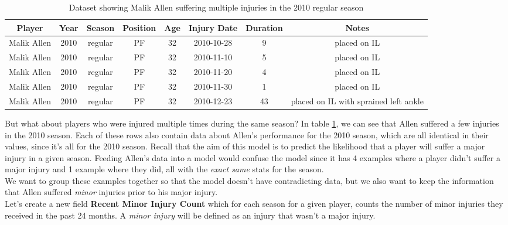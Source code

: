 \documentclass{article}
\begin{document}
\begin{center}
    \begin{table}
    \begin{tabular}{||c c c c c c c c||}
    \hline
    Player & Year & Season & Position & Age & Injury Date & Duration & Notes \\ [0.5ex]
    \hline\hline
    Malik Allen & 2010 & regular & PF & 32 & 2010-10-28 & 9 & placed on IL \\
    \hline
    Malik Allen & 2010 & regular & PF & 32 & 2010-11-10 & 5 & placed on IL \\
    \hline
    Malik Allen & 2010 & regular & PF & 32 & 2010-11-20 & 4 & placed on IL \\
    \hline
    Malik Allen & 2010 & regular & PF & 32 & 2010-11-30 & 1 & placed on IL \\
    \hline
    Malik Allen & 2010 & regular & PF & 32 & 2010-12-23 & 43 & placed on IL with sprained left ankle\\ [1ex]
    \hline
   \end{tabular}
   \caption{\label{tab:multiple-injuries}Dataset showing Malik Allen suffering multiple injuries in the 2010 regular season}
    \end{table}
\end{center}

But what about players who were injured multiple times during the same season? In table \ref{tab:multiple-injuries}, we can see
that Allen suffered a few injuries in the 2010 season. Each of these rows also contain data about 
Allen's performance for the 2010 season, which are all identical in their values, since it's all for the
2010 season. Recall that the aim of this model is to predict the likelihood that 
a player will suffer a major injury in a given season. Feeding Allen's data into a model 
would confuse the model since it has 4 examples where a player didn't suffer a major injury
and 1 example where they did, all with the \emph{exact same} stats for the season.\\

We want to group these examples together so that the model doesn't have contradicting data,
but we also want to keep the information that Allen suffered \emph{minor} injuries
prior to his major injury.\\

Let's create a new field \textbf{Recent Minor Injury Count} which for each
season for a given player, counts the number of minor injuries they received in the 
past 24 months. A \emph{minor injury} will be defined as an injury that wasn't a major injury.
\end{document}
